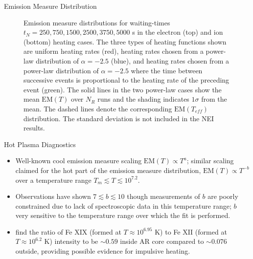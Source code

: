 \documentclass[final]{beamer}
\begin{document}
\begin{frame}
\begin{columns}[T]
\begin{column}{0.49\linewidth}
\begin{block}{Emission Measure Distribution}
\begin{figure}
{        \label{fig:electron_em}}
        \caption{Emission measure distributions for waiting-times $t_N=250,750,1500,2500,3750,5000$ s in the electron (top) and ion (bottom) heating cases. The three types of heating functions shown are uniform heating rates (red), heating rates chosen from a power-law distribution of $\alpha=-2.5$ (blue), and heating rates chosen from a power-law distribution of $\alpha=-2.5$ where the time between successive events is proportional to the heating rate of the preceding event (green). The solid lines in the two power-law cases show the mean $\mathrm{EM}(T)$ over $N_R$ runs and the shading indicates $1\sigma$ from the mean. The dashed lines denote the corresponding $\mathrm{EM}(T_{eff})$ distribution. The standard deviation is not included in the NEI results.}
      \end{figure}
      \vspace{-2ex}
    \end{block}
    \begin{block}{Hot Plasma Diagnostics}
      \vspace{-1ex}
      \begin{itemize}
        \item Well-known cool emission measure scaling $\mathrm{EM}(T)\propto T^a$;  similar scaling claimed for the hot part of the emission measure distribution, $\mathrm{EM}(T)\propto T^{-b}$ over a temperature range $T_m\lesssim T\lesssim10^{7.2}$.
        \item Observations have shown $7\lesssim b\lesssim10$ \citep{warren_systematic_2012} though measurements of $b$ are poorly constrained due to lack of spectroscopic data in this temperature range; $b$ very sensitive to the temperature range over which the fit is performed.
        \item \citet{brosius_pervasive_2014} find the ratio of Fe XIX (formed at $T\approx10^{6.95}$ K) to Fe XII (formed at $T\approx10^{6.2}$ K) intensity to be $\sim0.59$ inside AR core compared to $\sim0.076$ outside, providing possible evidence for impulsive heating.

\end{itemize}
\end{block}
\end{column}
\end{columns}
\end{frame}
\end{document}
